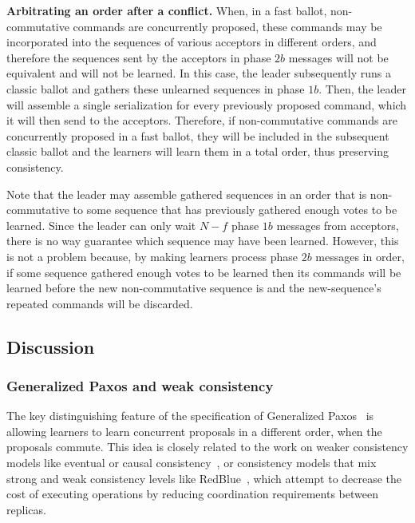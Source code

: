 \noindent \textbf{Arbitrating an order after a conflict.} When, in a fast ballot, non-commutative commands are  concurrently proposed, these commands may be incorporated into the sequences of various acceptors in different orders, and therefore the sequences sent by the acceptors in phase $2b$ messages will not be equivalent and will not be learned. In this case, the leader subsequently runs a classic ballot and gathers these unlearned sequences in phase $1b$. Then, the leader will assemble a single serialization for every previously proposed command, which it will then send to the acceptors. Therefore, if non-commutative commands are concurrently proposed in a fast ballot, they will be included in the subsequent classic ballot and the learners will learn them in a total order, thus preserving consistency. \par 
Note that the leader may assemble gathered sequences in an order that is non-commutative to some sequence that has previously gathered enough votes to be learned. Since the leader can only wait $N-f$ phase $1b$ messages from acceptors, there is no way guarantee which sequence may have been learned. However, this is not a problem because, by making learners process phase $2b$ messages in order, if some sequence gathered enough votes to be learned then its commands will be learned before the new non-commutative sequence is and the new-sequence's repeated commands will be discarded.\par

\subsection{Discussion}
\subsubsection{Generalized Paxos and weak consistency}
The key distinguishing feature of the specification of Generalized
Paxos~\cite{Lamport2005} is allowing learners to learn concurrent
proposals in a different order, when the proposals commute. This idea
is closely related to the work on weaker consistency models like eventual or
causal consistency~\cite{Ahamad1995}, or consistency models that mix
strong and weak consistency levels like RedBlue~\cite{Li2012}, which attempt
to decrease the cost of executing operations by reducing coordination
requirements between replicas. 

